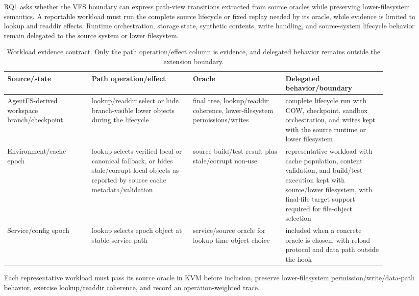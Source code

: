 RQ1 asks whether the VFS boundary can express path-view transitions extracted
from source oracles while preserving lower-filesystem semantics. A reportable
workload must run the complete source lifecycle or fixed replay needed by its
oracle, while \namei evidence is limited to lookup and readdir effects.
Runtime orchestration, storage state, synthetic contents, write handling, and
source-system lifecycle behavior remain delegated to the source system or
lower filesystem.

\begin{table}[t]
\centering
\scriptsize
\begin{tabular}{@{}L{0.2\linewidth}L{0.24\linewidth}L{0.22\linewidth}L{0.24\linewidth}@{}}
\hline
Source/state & Path operation/effect & Oracle & Delegated behavior/boundary \\
\hline
AgentFS-derived workspace branch/checkpoint~\cite{agentfs_repo} & lookup/readdir select or hide branch-visible lower objects during the lifecycle & final tree, lookup/readdir coherence, lower-filesystem permissions/writes & complete lifecycle run with COW, checkpoint, sandbox orchestration, and writes kept with the source runtime or lower filesystem \\
Environment/cache epoch~\cite{swe_factory_repo,menvagent_repo,swe_rebench_v2_repo} & lookup selects verified local or canonical fallback, or hides stale/corrupt local objects as reported by source cache metadata/validation & source build/test result plus stale/corrupt non-use & representative workload with cache population, content validation, and build/test execution kept with source/lower filesystem, with final-file target support required for file-object selection \\
Service/config epoch~\cite{kubernetes_projected_volumes,kubernetes_configmaps,kubernetes_secrets} & lookup selects epoch object at stable service path & service/source oracle for lookup-time object choice & included when a concrete oracle is chosen, with reload protocol and data path outside the hook \\
\hline
\end{tabular}
\caption{Workload evidence contract. Only the path operation/effect column is
\namei evidence, and delegated behavior remains outside the extension
boundary.}
\label{tab:workload-evidence}
\end{table}

Each representative workload must pass its source oracle in KVM before
inclusion, preserve lower-filesystem permission/write/data-path behavior,
exercise lookup/readdir coherence, and record an operation-weighted trace.


